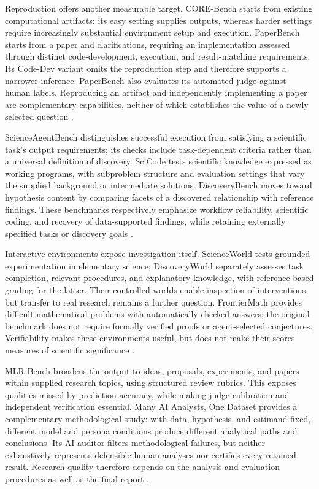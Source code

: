 Reproduction offers another measurable target. CORE-Bench starts from existing computational artifacts: its easy setting supplies outputs, whereas harder settings require increasingly substantial environment setup and execution. PaperBench starts from a paper and clarifications, requiring an implementation assessed through distinct code-development, execution, and result-matching requirements. Its Code-Dev variant omits the reproduction step and therefore supports a narrower inference. PaperBench also evaluates its automated judge against human labels. Reproducing an artifact and independently implementing a paper are complementary capabilities, neither of which establishes the value of a newly selected question \cite{core-bench,paperbench}.

ScienceAgentBench distinguishes successful execution from satisfying a scientific task's output requirements; its checks include task-dependent criteria rather than a universal definition of discovery. SciCode tests scientific knowledge expressed as working programs, with subproblem structure and evaluation settings that vary the supplied background or intermediate solutions. DiscoveryBench moves toward hypothesis content by comparing facets of a discovered relationship with reference findings. These benchmarks respectively emphasize workflow reliability, scientific coding, and recovery of data-supported findings, while retaining externally specified tasks or discovery goals \cite{scienceagentbench,scicode,discoverybench}.

Interactive environments expose investigation itself. ScienceWorld tests grounded experimentation in elementary science; DiscoveryWorld separately assesses task completion, relevant procedures, and explanatory knowledge, with reference-based grading for the latter. Their controlled worlds enable inspection of interventions, but transfer to real research remains a further question. FrontierMath provides difficult mathematical problems with automatically checked answers; the original benchmark does not require formally verified proofs or agent-selected conjectures. Verifiability makes these environments useful, but does not make their scores measures of scientific significance \cite{scienceworld,discoveryworld,frontiermath}.

MLR-Bench broadens the output to ideas, proposals, experiments, and papers within supplied research topics, using structured review rubrics. This exposes qualities missed by prediction accuracy, while making judge calibration and independent verification essential. Many AI Analysts, One Dataset provides a complementary methodological study: with data, hypothesis, and estimand fixed, different model and persona conditions produce different analytical paths and conclusions. Its AI auditor filters methodological failures, but neither exhaustively represents defensible human analyses nor certifies every retained result. Research quality therefore depends on the analysis and evaluation procedures as well as the final report \cite{mlr-bench,many-ai-analysts-one-dataset}.

